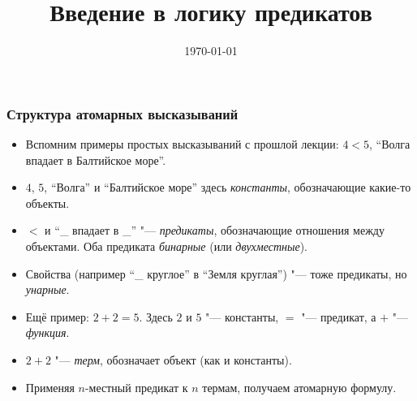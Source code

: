 \documentclass[10pt]{beamer}
\title{Введение в логику предикатов}
\date{\today}
\begin{document}
\begin{frame}[plain]
\maketitle
\end{frame}

\begin{frame}
    \frametitle{Структура атомарных высказываний}
    \begin{itemize}
        \item Вспомним примеры простых высказываний с прошлой лекции: $4<5$, \enquote{Волга впадает в Балтийское море}.
        \pause
        \item $4$, $5$, \enquote{Волга} и \enquote{Балтийское море} здесь \emph{константы}, обозначающие какие-то объекты.
        \item $<$ и \enquote{\_ впадает в \_} "--- \emph{предикаты}, обозначающие отношения между объектами. Оба предиката \emph{бинарные} (или \emph{двухместные}).
        \pause
        \item Свойства (например \enquote{\_ круглое} в \enquote{Земля круглая}) "--- тоже предикаты, но \emph{унарные}.
        \pause
        \item Ещё пример: $2+2=5$. Здесь $2$ и $5$ "--- \pause константы, $=$ "--- \pause предикат, а $+$ "--- \pause \emph{функция}.
        \item $2+2$ "--- \emph{терм}, обозначает объект (как и константы).
        \item Применяя $n$-местный предикат к $n$ термам, получаем атомарную формулу.
    \end{itemize}
\end{frame}
\end{document}
